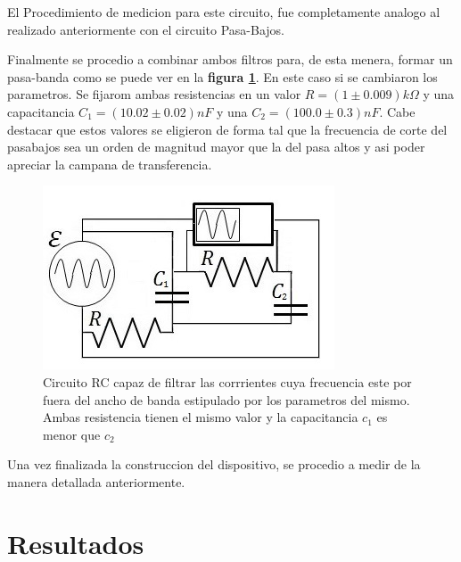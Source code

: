 \documentclass[11pt,a4paper]{article}
\begin{document}
El Procedimiento de medicion para este circuito, fue completamente analogo al realizado anteriormente con el circuito Pasa-Bajos. 

Finalmente se procedio a combinar ambos filtros para, de esta menera, formar un pasa-banda como se puede ver en la \textbf{figura \ref{fig:RC-PBD}}. En este caso si se cambiaron los parametros. Se fijarom ambas resistencias en un valor $R = (1 \pm 0.009)k\Omega$ y una capacitancia $C_{1} = (10.02 \pm 0.02)nF$ y una $C_{2} = (100.0 \pm 0.3)nF$. Cabe destacar que estos valores se eligieron de forma tal que la frecuencia de corte del pasabajos sea un orden de magnitud mayor que la del pasa altos y asi poder apreciar la campana de transferencia. 

\begin{figure}[h]
\centering
\includegraphics[scale=0.8]{Circuito-RC-Pasa-Banda}
  \caption{Circuito RC capaz de filtrar las corrrientes cuya frecuencia este por fuera del ancho de banda estipulado por los parametros del mismo. Ambas resistencia 
tienen el mismo valor y la capacitancia $c_{1}$ es menor que $c_{2}$}
  \label{fig:RC-PBD}
\end{figure}

Una vez finalizada la construccion del dispositivo, se procedio a medir de la manera detallada anteriormente.



\section{Resultados}
\label{sec:discusion}



\end{document}
